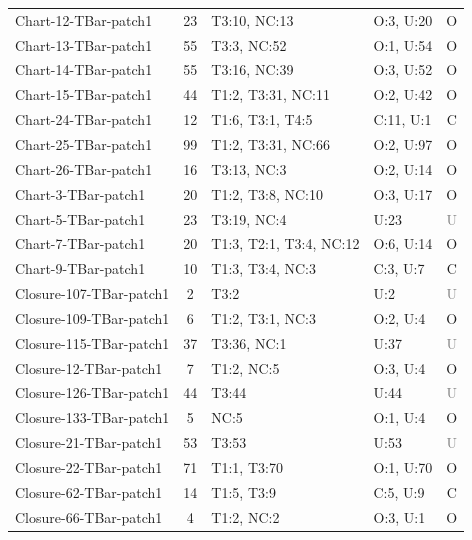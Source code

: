 \begin{table}[t]
\begin{tabular}{l|c|l|l|c}
Chart-12-TBar-patch1 & 23 & T3:10, NC:13 & O:3, U:20 & \textcolor{green!60!black}{O} \\
Chart-13-TBar-patch1 & 55 & T3:3, NC:52 & O:1, U:54 & \textcolor{green!60!black}{O} \\
Chart-14-TBar-patch1 & 55 & T3:16, NC:39 & O:3, U:52 & \textcolor{green!60!black}{O} \\
Chart-15-TBar-patch1 & 44 & T1:2, T3:31, NC:11 & O:2, U:42 & \textcolor{green!60!black}{O} \\
Chart-24-TBar-patch1 & 12 & T1:6, T3:1, T4:5 & C:11, U:1 & \textcolor{green!60!black}{C} \\
Chart-25-TBar-patch1 & 99 & T1:2, T3:31, NC:66 & O:2, U:97 & \textcolor{green!60!black}{O} \\
Chart-26-TBar-patch1 & 16 & T3:13, NC:3 & O:2, U:14 & \textcolor{green!60!black}{O} \\
Chart-3-TBar-patch1 & 20 & T1:2, T3:8, NC:10 & O:3, U:17 & \textcolor{green!60!black}{O} \\
Chart-5-TBar-patch1 & 23 & T3:19, NC:4 & U:23 & \textcolor{gray}{U} \\
Chart-7-TBar-patch1 & 20 & T1:3, T2:1, T3:4, NC:12 & O:6, U:14 & \textcolor{green!60!black}{O} \\
Chart-9-TBar-patch1 & 10 & T1:3, T3:4, NC:3 & C:3, U:7 & \textcolor{green!60!black}{C} \\
Closure-107-TBar-patch1 & 2 & T3:2 & U:2 & \textcolor{gray}{U} \\
Closure-109-TBar-patch1 & 6 & T1:2, T3:1, NC:3 & O:2, U:4 & \textcolor{green!60!black}{O} \\
Closure-115-TBar-patch1 & 37 & T3:36, NC:1 & U:37 & \textcolor{gray}{U} \\
Closure-12-TBar-patch1 & 7 & T1:2, NC:5 & O:3, U:4 & \textcolor{green!60!black}{O} \\
Closure-126-TBar-patch1 & 44 & T3:44 & U:44 & \textcolor{gray}{U} \\
Closure-133-TBar-patch1 & 5 & NC:5 & O:1, U:4 & \textcolor{green!60!black}{O} \\
Closure-21-TBar-patch1 & 53 & T3:53 & U:53 & \textcolor{gray}{U} \\
Closure-22-TBar-patch1 & 71 & T1:1, T3:70 & O:1, U:70 & \textcolor{green!60!black}{O} \\
Closure-62-TBar-patch1 & 14 & T1:5, T3:9 & C:5, U:9 & \textcolor{green!60!black}{C} \\
Closure-66-TBar-patch1 & 4 & T1:2, NC:2 & O:3, U:1 & \textcolor{green!60!black}{O} \\

\end{tabular}
\end{table}
